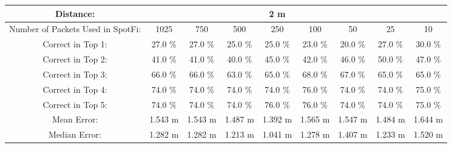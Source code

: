 \begin{tabular}{| c || c | c | c | c | c | c | c | c |}
\hline
Distance: &  &  &  & 2 m  &  &  &  &  \\
\hline
Number of Packets Used in SpotFi: & 1025 & 750 & 500 & 250 & 100 & 50 & 25 & 10 \\
\hline
\hline
Correct in Top 1: & 27.0 \% & 27.0 \% & 25.0 \% & 25.0 \% & 23.0 \% & 20.0 \% & 27.0 \% & 30.0 \% \\
\hline
Correct in Top 2: & 41.0 \% & 41.0 \% & 40.0 \% & 45.0 \% & 42.0 \% & 46.0 \% & 50.0 \% & 47.0 \% \\
\hline
Correct in Top 3: & 66.0 \% & 66.0 \% & 63.0 \% & 65.0 \% & 68.0 \% & 67.0 \% & 65.0 \% & 65.0 \% \\
\hline
Correct in Top 4: & 74.0 \% & 74.0 \% & 74.0 \% & 74.0 \% & 76.0 \% & 74.0 \% & 74.0 \% & 75.0 \% \\
\hline
Correct in Top 5: & 74.0 \% & 74.0 \% & 74.0 \% & 76.0 \% & 76.0 \% & 74.0 \% & 74.0 \% & 75.0 \% \\
\hline
\hline
Mean Error: & 1.543 m & 1.543 m & 1.487 m & 1.392 m & 1.565 m & 1.547 m & 1.484 m & 1.644 m \\
\hline
Median Error: & 1.282 m & 1.282 m & 1.213 m & 1.041 m & 1.278 m & 1.407 m & 1.233 m & 1.520 m \\
\hline
\end{tabular}